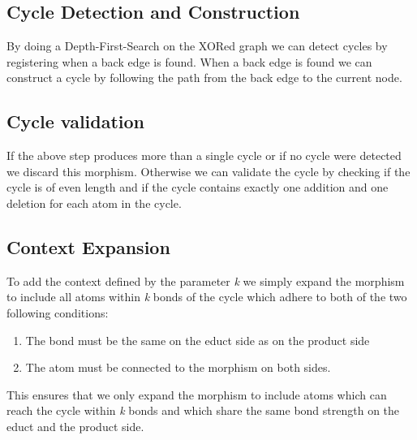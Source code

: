 \documentclass{article}
\begin{document}
\subsection{Cycle Detection and Construction}

By doing a Depth-First-Search on the XORed graph we can detect cycles by registering when a back edge is found. When a back edge is found we can construct a cycle by following the path from the back edge to the current node. 

\subsection{Cycle validation}

If the above step produces more than a single cycle or if no cycle were detected we discard this morphism. Otherwise we can validate the cycle by checking if the cycle is of even length and if the cycle contains exactly one addition and one deletion for each atom in the cycle.

\subsection{Context Expansion}

To add the context defined by the parameter \textit{k} we simply expand the morphism to include all atoms within \textit{k} bonds of the cycle which adhere to both of the two following conditions:
\begin{enumerate}
    \item The bond must be the same on the educt side as on the product side
    \item The atom must be connected to the morphism on both sides.
\end{enumerate}
This ensures that we only expand the morphism to include atoms which can reach the cycle within \textit{k} bonds and which share the same bond strength on the educt and the product side.

\newpage
\end{document}
